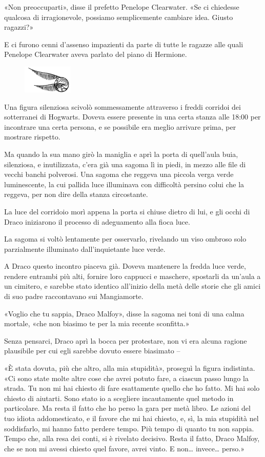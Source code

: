 «Non preoccuparti», disse il prefetto Penelope Clearwater. «Se ci chiedesse qualcosa di irragionevole, possiamo semplicemente cambiare idea. Giusto ragazzi?»

E ci furono cenni d’assenso impazienti da parte di tutte le ragazze alle quali Penelope Clearwater aveva parlato del piano di Hermione.

\begin{figure}[h!]
        \includegraphics[scale=0.4]{boccino.png}
        \centering
\end{figure}

Una figura silenziosa scivolò sommessamente attraverso i freddi corridoi dei sotterranei di Hogwarts. Doveva essere presente in una certa stanza alle 18:00 per incontrare una certa persona, e se possibile era meglio arrivare prima, per mostrare rispetto.

Ma quando la sua mano girò la maniglia e aprì la porta di quell’aula buia, silenziosa, e inutilizzata, c’era già una sagoma lì in piedi, in mezzo alle file di vecchi banchi polverosi. Una sagoma che reggeva una piccola verga verde luminescente, la cui pallida luce illuminava con difficoltà persino colui che la reggeva, per non dire della stanza circostante.

La luce del corridoio morì appena la porta si chiuse dietro di lui, e gli occhi di Draco iniziarono il processo di adeguamento alla fioca luce.

La sagoma si voltò lentamente per osservarlo, rivelando un viso ombroso solo parzialmente illuminato dall’inquietante luce verde.

A Draco questo incontro piaceva già. Doveva mantenere la fredda luce verde, rendere entrambi più alti, fornire loro cappucci e maschere, spostarli da un’aula a un cimitero, e sarebbe stato identico all’inizio della metà delle storie che gli amici di suo padre raccontavano sui Mangiamorte.

«Voglio che tu sappia, Draco Malfoy», disse la sagoma nei toni di una calma mortale, «che non biasimo te per la mia recente sconfitta.»

Senza pensarci, Draco aprì la bocca per protestare, non vi era alcuna ragione plausibile per cui egli sarebbe dovuto essere biasimato –

«È stata dovuta, più che altro, alla mia stupidità», proseguì la figura indistinta. «Ci sono state molte altre cose che avrei potuto fare, a ciascun passo lungo la strada. Tu non mi hai chiesto di fare esattamente quello che ho fatto. Mi hai solo chiesto di aiutarti. Sono stato io a scegliere incautamente quel metodo in particolare. Ma resta il fatto che ho perso la gara per metà libro. Le azioni del tuo idiota addomesticato, e il favore che mi hai chiesto, e, sì, la mia stupidità nel soddisfarlo, mi hanno fatto perdere tempo. Più tempo di quanto tu non sappia. Tempo che, alla resa dei conti, si è rivelato decisivo. Resta il fatto, Draco Malfoy, che se non mi avessi chiesto quel favore, avrei vinto. E non… invece… perso.»

